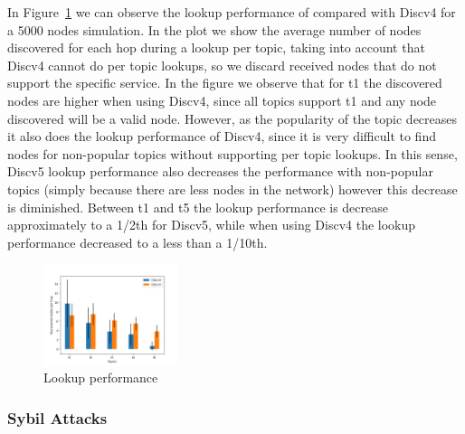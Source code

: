 In Figure~\ref{fig:hopcount} we can observe the lookup performance of \sysname compared with Discv4 for a 5000 nodes simulation.
In the plot we show the average number of nodes discovered for each hop during a lookup per topic, taking into account that Discv4 cannot do per topic lookups,  so we discard received nodes that do not support the specific service.
In the figure we observe that for t1 the discovered nodes are higher when using Discv4, since all topics support t1 and any node discovered will be a valid node. 
However, as the popularity of the topic decreases it also does the lookup performance of Discv4,  since it is very difficult to find nodes for non-popular topics without supporting per topic lookups.
In this sense,  Discv5 lookup performance also decreases the performance with non-popular topics (simply because there are less nodes in the network) however this decrease is diminished.  Between t1 and t5 the lookup performance is decrease approximately to a 1/2th for Discv5, while when using Discv4 the lookup performance decreased to a less than a 1/10th.


\begin{figure}[h!]
\centering
\includegraphics[width=0.35\textwidth]{img/eval/lookup_hopcount_discv4.png}
\caption{Lookup performance}
\label{fig:hopcount}
\vspace{-0.15in}
\end{figure}

\subsubsection{Sybil Attacks}

